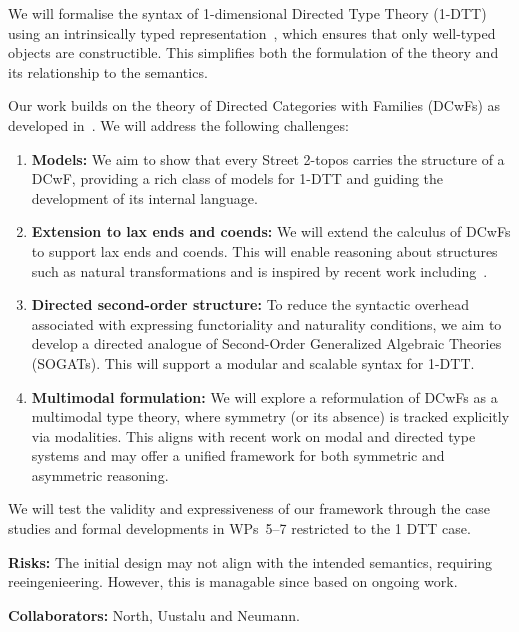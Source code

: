 \documentclass[a4paper,11pt]{article}
\begin{document}
We will formalise the syntax of 1-dimensional Directed Type Theory
(1-DTT) using an intrinsically typed
representation~\cite{altenkirch2016type}, which ensures that only
well-typed objects are constructible. This simplifies both the
formulation of the theory and its relationship to the semantics. 

Our work builds on the theory of Directed Categories with Families
(DCwFs) as developed in~\cite{altenkirch_neumann_2024}. We will address the
following challenges: 

\begin{enumerate}
\item \textbf{Models:} We aim to show that every Street 2-topos carries the structure of a DCwF, providing a rich class of models for 1-DTT and guiding the development of its internal language.

\item \textbf{Extension to lax ends and coends:} We will extend the
  calculus of DCwFs to support lax ends and coends. This will enable
  reasoning about structures such as natural transformations and is
  inspired by recent work including~\cite{north_2019}.  

\item \textbf{Directed second-order structure:} To reduce the
  syntactic overhead associated with expressing functoriality and
  naturality conditions, we aim to develop a directed analogue of
  Second-Order Generalized Algebraic Theories (SOGATs). This will support a modular
  and scalable syntax for 1-DTT. 

\item \textbf{Multimodal formulation:} We will explore a reformulation
  of DCwFs as a multimodal type theory, where symmetry (or its
  absence) is tracked explicitly via modalities. This aligns with
  recent work on modal and directed type systems and may offer a
  unified framework for both symmetric and asymmetric reasoning.
\end{enumerate}

We will test the validity and expressiveness of our 
framework through the case studies and formal developments in
WPs~5--7 restricted to the 1 DTT case.

\textbf{Risks:}
The initial design may not align with the intended semantics,
requiring reeingenieering. However, this is managable since based on
ongoing work.

\textbf{Collaborators:}
North, Uustalu and Neumann.

  
\end{document}
